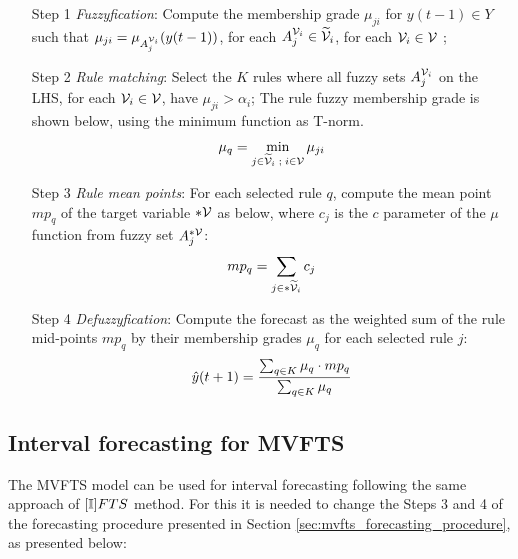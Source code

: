 \begin{enumerate}
\item [Step 1] \textit{Fuzzyfication}: Compute the membership grade $\mu_{ji}$ for $y(t-1) \in Y$ such that $\mu_{ji} = \mu_{A_j^{\mathcal{V}_i}}(y(t-1))$, for each $A_j^{\mathcal{V}_i} \in \widetilde{\mathcal{V}}_i$, for each $\mathcal{V}_i \in \mathcal{V}$ ;
\item [Step 2] \textit{Rule matching}: Select the $K$ rules where all fuzzy sets $A_j^{\mathcal{V}_i}$ on the LHS, for each $\mathcal{V}_i \in \mathcal{V}$, have $\mu_{ji} > \alpha_i$; The rule fuzzy membership grade is shown below, using the minimum function as T-norm.
\begin{equation}
    \mu_q = \min_{j \in \widetilde{\mathcal{V}}_i\; ; \; i \in \mathcal{V}} \mu_{ji}
\end{equation}
\item [Step 3] \textit{Rule mean points}: For each selected rule $q$, compute the mean point $mp_q$ of the target variable $*\mathcal{V}$ as below, where $c_j$ is the $c$ parameter of the $\mu$ function from fuzzy set $A_j^{*\mathcal{V}}$:
\begin{equation}
mp_q = \sum_{j \in *\widetilde{\mathcal{V}}_i} c_j
\end{equation}
\item [Step 4] \textit{Defuzzyfication}: Compute the forecast as the weighted sum of the rule mid-points $mp_q$ by their membership grades $\mu_q$ for each selected rule $j$:
\begin{equation}
\hat{y}(t+1) = \frac{\sum_{q \in K} \mu_q \cdot mp_q}{\sum_{q \in K} \mu_q}
\end{equation}
\end{enumerate}

\subsection{Interval forecasting for MVFTS}
\label{sec:mvfts_interval}

The MVFTS model can be used for interval forecasting following the same approach of $[\mathbb{I}]FTS$ method. For this it is needed to change the Steps 3 and 4 of the forecasting procedure presented in Section \ref{sec:mvfts_forecasting_procedure}, as presented below:

